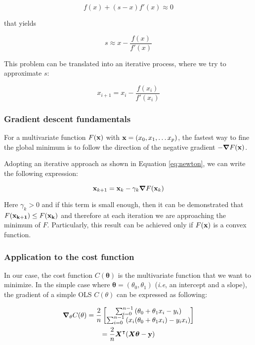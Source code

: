 \documentclass[11pt,a4paper,twocolumn]{article}
\begin{document}
\begin{equation}
	f(x) + (s-x) f'(x) \approx 0
\end{equation}

that yields 

\begin{equation}
	s\approx x-\frac{f(x)}{f'(x)}
\end{equation}

This problem can be translated into an iterative process, where we try to approximate $s$:

\begin{equation} \label{eq:newton}
	x_{i+1} = x_i - \frac{f(x_i)}{f'(x_i)}
\end{equation}

\subsubsection{Gradient descent fundamentals}
For a multivariate function $F(\bold{x})$ with $\bold{x} = (x_0, x_1, \dots x_p)$, the fastest way to fine the global minimum is to follow the direction of the negative gradient $- \grad F(\bold{x})$.

Adopting an iterative approach as shown in Equation \eqref{eq:newton}, we can write the following expression:

\begin{equation}
	\bold{x}_{k+1} = \mathbf{x}_k - \gamma_k \grad F(\mathbf{x}_k)
\end{equation}
	
Here $\gamma_k > 0$ and if this term is small enough, then it can be demonstrated that $F(\bold{x_{k+1}}) \leq F(\bold{x_k})$ and therefore at each iteration we are approaching the minimum of $F$. Particularly, this result can be achieved only if $F(\bold{x})$ is a convex function.

\subsubsection{Application to the cost function}
In our case, the cost function $C(\boldsymbol{\theta})$ is the multivariate function that we want to minimize. In the simple case where $\boldsymbol{\theta} = (\theta_0, \theta_1)$ (\emph{i.e}, an intercept and a slope), the gradient of a simple OLS $C(\theta)$ can be expressed as following:

\begin{multline} \label{eq:gradcost}
	\grad_{\bold{\theta}} C(\bold{\theta}) = 
	\frac{2}{n}\begin{bmatrix} \sum_{i=0}^{n-1} \left(\theta_0+\theta_1x_i-y_i\right) \\
		\sum_{i=0}^{n-1}\left( x_i (\theta_0+\theta_1x_i)-y_ix_i\right) \\
	\end{bmatrix} \\
   	= \frac{2}{n}\boldsymbol{X}^\intercal(\boldsymbol{X\theta} - \mathbf{y})
\end{multline}
\end{document}
